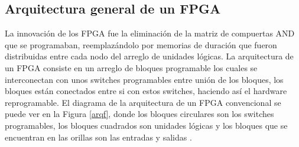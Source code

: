\documentclass[twoside,spanish,ESP,MSc]{plantillaLabUPV}
\theoremstyle{definition}
\newcommand{\f}{FPGA }
\newcommand{\fs}{FPGAs }
\begin{document}
%
%
%


\subsection{Arquitectura general de un FPGA}
La innovación de los FPGA fue la eliminación de la matriz de compuertas AND que se programaban, reemplazándolo por memorias de duración que fueron distribuidas entre cada nodo del arreglo de unidades lógicas. La arquitectura de un \f consiste en un arreglo de bloques programable los cuales se interconectan con unos switches programables entre unión de los bloques, los bloques están conectados entre si con estos switches, haciendo así el hardware reprogramable. El diagrama de la arquitectura de un \f convencional se puede ver en la Figura \ref{arqf}, donde los bloques circulares son los switches programables, los bloques cuadrados son unidades lógicas y los bloques que se encuentran en las orillas son las entradas y salidas \cite{fpgaparts}. 
\end{document}
